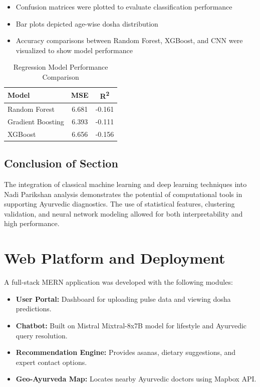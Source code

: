 \documentclass[10pt,twocolumn]{article}
\begin{document}
\begin{itemize}
    \item Confusion matrices were plotted to evaluate classification performance
    \item Bar plots depicted age-wise dosha distribution
    \item Accuracy comparisons between Random Forest, XGBoost, and CNN were visualized to show model performance
\end{itemize}
\begin{table}[H]
\centering
\caption{Regression Model Performance Comparison}
\begin{tabular}{lcc}
\toprule
\textbf{Model} & \textbf{MSE} & \textbf{R\textsuperscript{2}} \\
\midrule
Random Forest     & 6.681 & -0.161 \\
Gradient Boosting & 6.393 & -0.111 \\
XGBoost           & 6.656 & -0.156 \\
\bottomrule
\end{tabular}
\label{tab:regression-results}
\end{table}
\subsection{Conclusion of Section}

The integration of classical machine learning and deep learning techniques into Nadi Parikshan analysis demonstrates the potential of computational tools in supporting Ayurvedic diagnostics. The use of statistical features, clustering validation, and neural network modeling allowed for both interpretability and high performance.

\section{Web Platform and Deployment}
A full-stack MERN application was developed with the following modules:
\begin{itemize}
    \item \textbf{User Portal:} Dashboard for uploading pulse data and viewing dosha predictions.
    \item \textbf{Chatbot:} Built on Mistral Mixtral-8x7B model for lifestyle and Ayurvedic query resolution.
    \item \textbf{Recommendation Engine:} Provides asanas, dietary suggestions, and expert contact options.
    \item \textbf{Geo-Ayurveda Map:} Locates nearby Ayurvedic doctors using Mapbox API.
\end{itemize}
\end{document}
